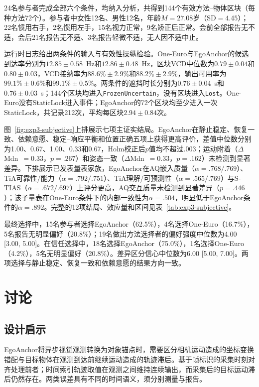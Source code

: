 \documentclass[review]{vgtc}
\begin{document}
24名参与者完成全部六个条件，均纳入分析，共得到144个有效方法--物体区块（每种方法72个）。参与者中女性12名、男性12名，年龄$M=27.08$岁（$\mathrm{SD}=4.45$）；22名惯用右手，2名惯用左手，15名视力正常，9名矫正后正常。会前全部报告无不适，会后21名报告无不适、3名报告轻微不适，无人因不适中止。

运行时日志给出两条件的输入与有效性操纵检验。One-Euro与EgoAnchor的候选到达率分别为$12.85\pm0.58$~Hz和$12.86\pm0.48$~Hz，区块VCD中位数为$0.79\pm0.04$和$0.80\pm0.03$，VCD接纳率为$88.6\%\pm2.9\%$和$88.2\%\pm2.9\%$，输出可用率为$99.1\%\pm0.6\%$和$99.1\%\pm0.5\%$。两条件的遮挡时长分别为$0.76\pm0.04$~s和$0.76\pm0.03$~s；144个区块均进入\texttt{FrozenUncertain}，没有区块进入\texttt{Lost}。One-Euro没有StaticLock进入事件；EgoAnchor的72个区块均至少进入一次StaticLock，共记录212次，平均每区块$2.94\pm0.84$次。

图~\ref{fig:exp3-subjective}上排展示七项主证实结局。EgoAnchor在静止稳定、恢复一致、依赖意愿、稳定--响应平衡和位置正确五项上获得更高评价，差值中位数分别为1.00、0.67、1.00、0.33和0.67，Holm校正后$p$值均不超过.003；运动附着（$\Delta$Mdn~$=0.33$，$p=.267$）和姿态一致（$\Delta$Mdn~$=0.33$，$p=.162$）未检测到显著差异。下排展示已发表量表家族，EgoAnchor在AQ嵌入质量（$\alpha = .768/.769$）、TiA可靠性/能力（$\alpha = .792/.751$）、TiA理解/可预测性（$\alpha = .565/.769$）与S-TIAS（$\alpha = .672/.697$）上评分更高，AQ交互质量未检测到显著差异（$p=.446$）；该子量表在One-Euro条件下的内部一致性为$\alpha = .504$，明显低于EgoAnchor条件的$\alpha = .892$。完整的12项结局、效应量和区间见表~\ref{tab:exp3-subjective}。

最终选择中，15名参与者选择EgoAnchor（62.5\%），4名选择One-Euro（16.7\%），5名报告无明显偏好（20.8\%）；19名做出方法选择者的偏好强度中位数为4.00 [3.00, 5.00]。在信任选择中，18名选择EgoAnchor（75.0\%），1名选择One-Euro（4.2\%），5名无明显偏好（20.8\%）。差异区分信心中位数为6.00 [5.00, 7.00]。两项选择与静止稳定、恢复一致和依赖意愿的结果方向一致。



\section{讨论}\label{sec:discussion}

\subsection{设计启示}

EgoAnchor将异步视觉观测转换为对象锚点时，需要区分相机运动造成的坐标变换错配与目标物体在观测到达前继续运动造成的轨迹滞后。基于帧标识的采集时刻对齐处理前者；时间索引轨迹取值在观测之间维持连续输出，而采集后的目标运动滞后仍然存在。两类误差具有不同的时间语义，须分别测量与报告。
\end{document}
